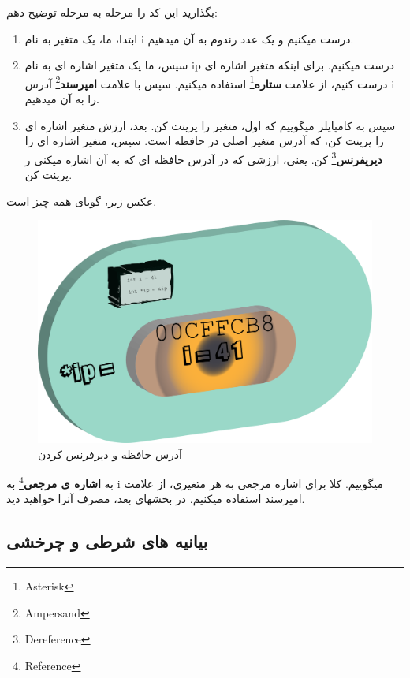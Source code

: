 \documentclass[14pt,a4paper]{memoir}
\begin{document}
	

	 بگذارید این کد را مرحله به مرحله توضیح دهم:
	 \begin{enumerate}
	 	\item  ابتدا، ما،  یک متغیر به نام i درست میکنیم و یک عدد رندوم به آن میدهیم.
	 	\item  سپس، ما یک متغیر اشاره ای به نام ip درست میکنیم. برای اینکه متغیر اشاره ای درست کنیم، از علامت \textbf{ستاره}\footnote{Asterisk} استفاده میکنیم. سپس با علامت \textbf{امپرسند}\footnote{Ampersand} آدرس i را به آن میدهیم.
	 	\item سپس به کامپایلر میگوییم که اول، متغیر را پرینت کن. بعد، ارزش متغیر اشاره ای را پرینت کن، که آدرس متغیر اصلی در حافظه است. سپس، متغیر اشاره ای را \textbf{دیریفرنس}\footnote{Dereference} کن. یعنی، ارزشی که در آدرس حافظه ای که به آن اشاره میکنی ر پرینت کن.
	 \end{enumerate}
 
 عکس زیر، گویای همه چیز است.
	 
	 
	 
	 
	 \begin{figure}[H]
	 	\centering
	 	\includegraphics[scale=0.2]{MemoryAddress}
	 	\caption{آدرس حافظه و دیرفرنس کردن}
	 \end{figure}
	 
	 به  \textbf{اشاره ی مرجعی}\footnote{Reference} به i میگوییم. کلا برای اشاره مرجعی به هر متغیری، از علامت امپرسند استفاده میکنیم. در بخشهای بعد، مصرف آنرا خواهید دید.
	 
	 
	 
	 
	 
	 
	 \subsection{بیانیه های شرطی و چرخشی}\label{cppifcond}
	 
\end{document}
